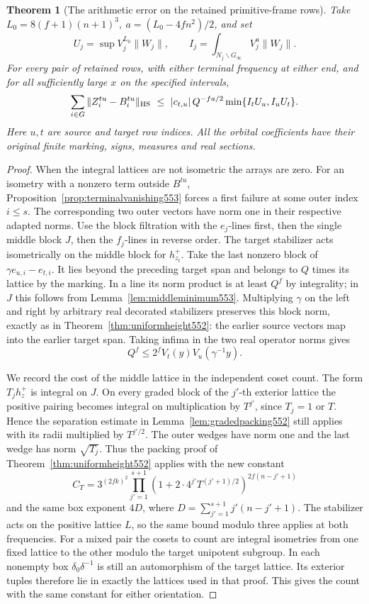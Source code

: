 \documentclass[a4paper,11pt]{article}
\newtheorem{theorem}[proposition]{Theorem}
\theoremstyle{definition}
\theoremstyle{remark}
\numberwithin{equation}{section}
\begin{document}
\begin{theorem}[The arithmetic error on the retained primitive-frame rows]
\leavevmode\label{thm:bothordinary553}
Take \(L_0=8(f+1)(n+1)^3,\ a=(L_0-4fn^2)/2\), and set
\[
 U_j=\sup V_j^{L_0}\|W_j\|,\qquad
 I_j=\int_{N_j\backslash G_\infty}V_j^a\|W_j\| .
\]
For every pair of retained rows, with either terminal frequency
at either end, and for all sufficiently large \(x\) on the
specified intervals,
\[
       \sum_{i\in G}\|Z_i^{tu}-B_i^{tu}\|_{\rm HS}
       \ \le\ |c_{t,u}|\,Q^{-fa/2}
                        \min\{I_t U_u,I_u U_t\}.
\]
Here \(u,t\) are source and target row indices. All the orbital
coefficients have their original finite marking, signs, measures
and real sections.
\end{theorem}
\begin{proof}
When the integral lattices are not isometric the arrays are
zero. For an isometry with a nonzero term outside \(B^{tu}\),
Proposition~\ref{prop:terminalvanishing553} forces a first
failure at some outer index \(i\le s\). The corresponding two
outer vectors have norm one in their respective adapted norms.
Use the block filtration with the \(e_j\)-lines first, then
the single middle block \(J\), then the \(f_j\)-lines in
reverse order. The target stabilizer acts isometrically on
the middle block for \(h_{z_t}^+\). Take the last nonzero
block of \(\gamma e_{u,i}-e_{t,i}\). It lies beyond the
preceding target span and belongs to \(Q\) times its lattice
by the marking. In a line its norm product is at least \(Q^f\)
by integrality; in \(J\) this follows from
Lemma~\ref{lem:middleminimum553}. Multiplying \(\gamma\) on
the left and right by arbitrary real decorated stabilizers
preserves this block norm, exactly as in
Theorem~\ref{thm:uniformheight552}: the earlier source vectors
map into the earlier target span. Taking infima in the two
real operator norms gives
\[
           Q^f\le 2^f V_t(y)V_u(\gamma^{-1}y).
\]

We record the cost of the middle lattice in the independent
coset count. The form \(T_j h_z^+\) is integral on \(J\).
On every graded block of the \(j'\)-th exterior lattice the
positive pairing becomes integral on multiplication by
\(T^{j'}\), since \(T_j=1\) or \(T\). Hence the separation
estimate in Lemma~\ref{lem:gradedpacking552} still applies
with its radii multiplied by \(T^{j'/2}\). The outer wedges
have norm one and the last wedge has norm \(\sqrt{T_j}\).
Thus the packing proof of Theorem~\ref{thm:uniformheight552}
applies with the new constant
\[
 C_T=3^{(2fk)^2}
   \prod_{j'=1}^{s+1}(1+2\cdot4^{j'}T^{(j'+1)/2})^{2f(n-j'+1)}
\]
and the same box exponent \(4D\), where
\(D=\sum_{j'=1}^{s+1}j'(n-j'+1)\). The stabilizer acts on
the positive lattice \(L\), so the same bound modulo three
applies at both frequencies. For a mixed pair the cosets to
count are integral isometries from one fixed lattice to the
other modulo the target unipotent subgroup. In each nonempty
box \(\delta_0\delta^{-1}\) is still an automorphism of the
target lattice. Its exterior tuples therefore lie in exactly
the lattices used in that proof. This gives the count with
the same constant for either orientation.


\end{proof}
\end{document}
